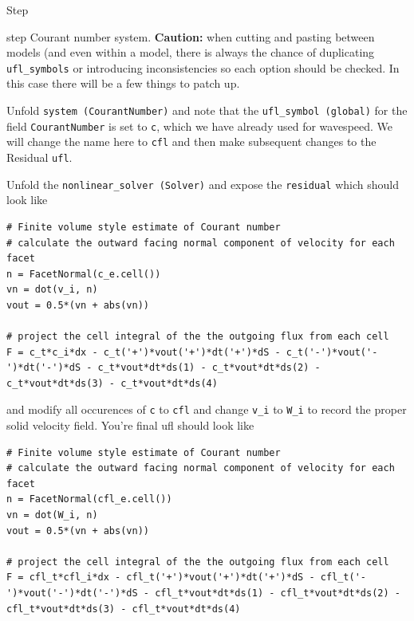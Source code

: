 \begin{steps}{Step}
\begin{steps}{step}
    Courant number system. \textbf{Caution:} when cutting and pasting
    between models (and even within a model, there is always the
    chance of duplicating \texttt{ufl\_symbols} or introducing
    inconsistencies so each option should be checked. In this case
    there will be a few things to patch up.
  \item Unfold \texttt{system (CourantNumber)} and note that the
    \texttt{ufl\_symbol (global)} for the field \texttt{CourantNumber}
    is set to \texttt{c}, which we have already used for wavespeed.
    We will change the name here to \texttt{cfl} and then make
    subsequent changes to the Residual \texttt{ufl}.
  \item Unfold the \texttt{nonlinear\_solver (Solver)} and expose the
    \texttt{residual} which should look like
    \begin{lstlisting}[style=UFL]
      # Finite volume style estimate of Courant number
# calculate the outward facing normal component of velocity for each facet
n = FacetNormal(c_e.cell())
vn = dot(v_i, n)
vout = 0.5*(vn + abs(vn))

# project the cell integral of the the outgoing flux from each cell
F = c_t*c_i*dx - c_t('+')*vout('+')*dt('+')*dS - c_t('-')*vout('-')*dt('-')*dS - c_t*vout*dt*ds(1) - c_t*vout*dt*ds(2) - c_t*vout*dt*ds(3) - c_t*vout*dt*ds(4)
    \end{lstlisting}
and modify all occurences of \texttt{c} to \texttt{cfl} and change
\texttt{v\_i} to \texttt{W\_i} to record the proper solid velocity
field.  You're final ufl should look like
\begin{lstlisting}[style=UFL]
  # Finite volume style estimate of Courant number
# calculate the outward facing normal component of velocity for each facet
n = FacetNormal(cfl_e.cell())
vn = dot(W_i, n)
vout = 0.5*(vn + abs(vn))

# project the cell integral of the the outgoing flux from each cell
F = cfl_t*cfl_i*dx - cfl_t('+')*vout('+')*dt('+')*dS - cfl_t('-')*vout('-')*dt('-')*dS - cfl_t*vout*dt*ds(1) - cfl_t*vout*dt*ds(2) - cfl_t*vout*dt*ds(3) - cfl_t*vout*dt*ds(4)
\end{lstlisting}


  \end{steps}



\end{steps}


